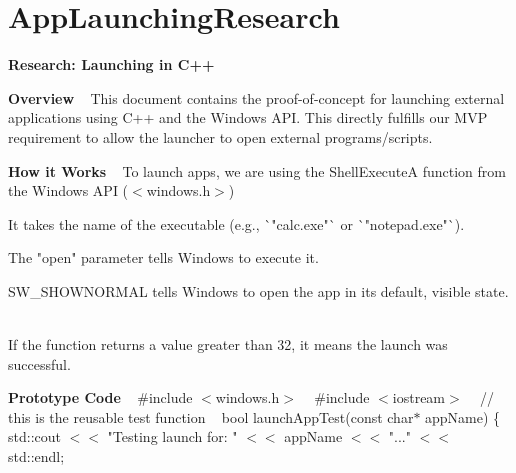 \chapter{App\+Launching\+Research }
\hypertarget{md__2shr_2Github_2WheelTime_2notes_2AppLaunchingResearch}{}\label{md__2shr_2Github_2WheelTime_2notes_2AppLaunchingResearch}
{\bfseries{Research:\+  Launching in C++}}

{\bfseries{Overview}} ~\newline
 This document contains the proof-\/of-\/concept for launching external applications using C++ and the Windows API. This directly fulfills our MVP requirement to allow the launcher to open external programs/\+scripts.

{\bfseries{How it Works}} ~\newline
 To launch apps, we are using the Shell\+ExecuteA function from the Windows API (\texorpdfstring{$<$}{<}windows.\+h\texorpdfstring{$>$}{>})


\begin{DoxyItemize}
\item It takes the name of the executable (e.\+g., \`{}"{}calc.\+exe"{}\`{} or \`{}"{}notepad.\+exe"{}\`{}). ~\newline

\item The "{}open"{} parameter tells Windows to execute it. ~\newline

\item SW\+\_\+\+SHOWNORMAL tells Windows to open the app in its default, visible state. ~\newline

\item If the function returns a value greater than 32, it means the launch was successful.
\end{DoxyItemize}

{\bfseries{Prototype Code}} ~\newline
 \#include \texorpdfstring{$<$}{<}windows.\+h\texorpdfstring{$>$}{>} ~\newline
 \#include \texorpdfstring{$<$}{<}iostream\texorpdfstring{$>$}{>} ~\newline
 /\+/\+ this is the reusable test function ~\newline
 bool launch\+App\+Test(const char\texorpdfstring{$\ast$}{*} app\+Name) \{ ~\newline
 std::\+cout \texorpdfstring{$<$}{<}\texorpdfstring{$<$}{<} "{}\+Testing launch for:\+ "{} \texorpdfstring{$<$}{<}\texorpdfstring{$<$}{<} app\+Name \texorpdfstring{$<$}{<}\texorpdfstring{$<$}{<} "{}..."{} \texorpdfstring{$<$}{<}\texorpdfstring{$<$}{<} std::\+endl; ~\newline


